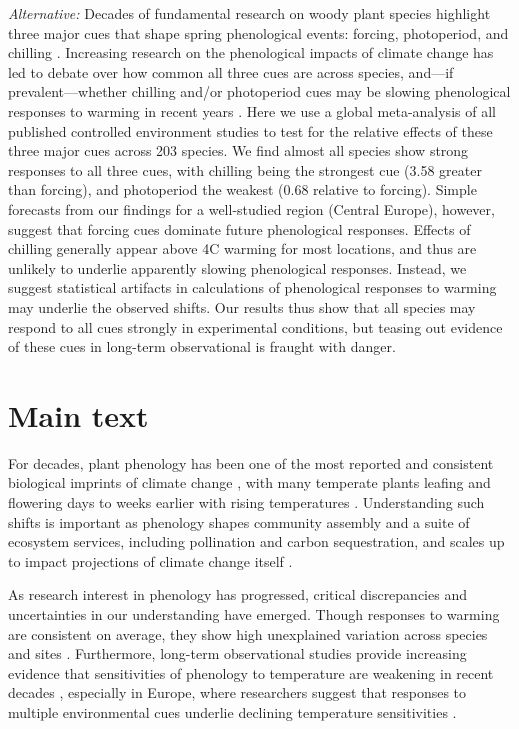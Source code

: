 \documentclass{article}
\begin{document}
\emph{Alternative:} Decades of fundamental research on woody plant species highlight three major cues that shape spring phenological events: forcing, photoperiod, and chilling \citep[e.g.,][]{Campbell:1975aa,Heide:2008aa,flynn2018}. Increasing research on the phenological impacts of climate change has led to debate over how common all three cues are across species, and---if prevalent---whether chilling and/or photoperiod cues may be slowing phenological responses to warming in recent years \citep{Heide:2011aa,koerner2010b,fu2015,zohner2016}. Here we use a global meta-analysis of all published controlled environment studies to test for the relative effects of these three major cues across 203 species. We find almost all species show strong responses to all three cues, with chilling being the strongest cue (3.58 greater than forcing), and photoperiod the weakest (0.68 relative to forcing). Simple forecasts from our findings for a well-studied region (Central Europe), however, suggest that forcing cues dominate future phenological responses. Effects of chilling generally appear above 4\degree C warming for most locations, and thus are unlikely to underlie apparently slowing phenological responses. Instead, we suggest statistical artifacts in calculations of phenological responses to warming may underlie the observed shifts. Our results thus show that all species may respond to all cues strongly in experimental conditions, but teasing out evidence of these cues in long-term observational is fraught with danger.


\section* {Main text}

\par For decades, plant phenology has been one of the most reported and consistent biological imprints of climate change \citep{IPCC:2014sm}, with many temperate plants leafing and flowering days to weeks earlier with rising temperatures \citep{millerrushing2008,menzel2006}. Understanding such shifts is important as phenology shapes community assembly and a suite of ecosystem services, including pollination and carbon sequestration, and scales up to impact projections of climate change itself \cite{Cleland:2007or}.

\par As research interest in phenology has progressed, critical discrepancies and uncertainties in our understanding have emerged. Though responses to warming are consistent on average, they show high unexplained variation across species and sites \citep{Wolkovich:2012n}. Furthermore, long-term observational studies provide increasing evidence that sensitivities of phenology to temperature are weakening in recent decades \citep{Rutishauser:2008,yu2010}, especially in Europe, where researchers suggest that responses to multiple environmental cues underlie declining temperature sensitivities \citep{fu2015}.
\end{document}
